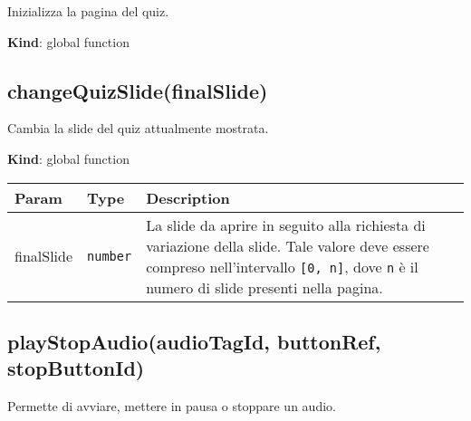 Inizializza la pagina del quiz.

\textbf{Kind}: global function\\
\protect\hypertarget{changeQuizSlide}{}{}

\hypertarget{changequizslidefinalslide}{%
\subsection{changeQuizSlide(finalSlide)}\label{changequizslidefinalslide}}

Cambia la slide del quiz attualmente mostrata.

\textbf{Kind}: global function

\begin{tabularx}{\textwidth}{XXX}
\toprule
\begin{minipage}[b]{0.30\columnwidth}\raggedright
Param\strut
\end{minipage} & \begin{minipage}[b]{0.30\columnwidth}\raggedright
Type\strut
\end{minipage} & \begin{minipage}[b]{0.30\columnwidth}\raggedright
Description\strut
\end{minipage}\tabularnewline
\midrule
\endhead
\begin{minipage}[t]{0.30\columnwidth}\raggedright
finalSlide\strut
\end{minipage} & \begin{minipage}[t]{0.30\columnwidth}\raggedright
\texttt{number}\strut
\end{minipage} & \begin{minipage}[t]{0.30\columnwidth}\raggedright
La slide da aprire in seguito alla richiesta di variazione della slide.
Tale valore deve essere compreso nell'intervallo \texttt{{[}0,\ n{]}},
dove \texttt{n} è il numero di slide presenti nella pagina.\strut
\end{minipage}\tabularnewline
\bottomrule
\end{tabularx}

\protect\hypertarget{playStopAudio}{}{}

\hypertarget{playstopaudioaudiotagid-buttonref-stopbuttonid}{%
\subsection{playStopAudio(audioTagId, buttonRef,
stopButtonId)}\label{playstopaudioaudiotagid-buttonref-stopbuttonid}}

Permette di avviare, mettere in pausa o stoppare un audio.

